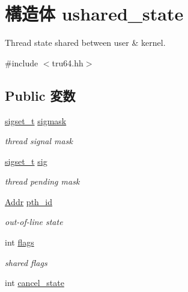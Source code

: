 \hypertarget{structTru64_1_1ushared__state}{
\section{構造体 ushared\_\-state}
\label{structTru64_1_1ushared__state}
}


Thread state shared between user \& kernel.  


{\ttfamily \#include $<$tru64.hh$>$}\subsection*{Public 変数}
\begin{DoxyCompactItemize}
\item 
\hyperlink{classTru64_ae770e87ab143e8ad7feaf75b78a89718}{sigset\_\-t} \hyperlink{structTru64_1_1ushared__state_a84a273d642c19957017a87b1f54031e6}{sigmask}
\begin{DoxyCompactList}\small\item\em thread signal mask \item\end{DoxyCompactList}\item 
\hyperlink{classTru64_ae770e87ab143e8ad7feaf75b78a89718}{sigset\_\-t} \hyperlink{structTru64_1_1ushared__state_a9c53d1e3c0bc3d8be6911f0f232a7079}{sig}
\begin{DoxyCompactList}\small\item\em thread pending mask \item\end{DoxyCompactList}\item 
\hyperlink{base_2types_8hh_af1bb03d6a4ee096394a6749f0a169232}{Addr} \hyperlink{structTru64_1_1ushared__state_a7e2b56424c95350d108ff8d0fab23b48}{pth\_\-id}
\begin{DoxyCompactList}\small\item\em out-\/of-\/line state \item\end{DoxyCompactList}\item 
int \hyperlink{structTru64_1_1ushared__state_ac8bf36fe0577cba66bccda3a6f7e80a4}{flags}
\begin{DoxyCompactList}\small\item\em shared flags \item\end{DoxyCompactList}\item 
int \hyperlink{structTru64_1_1ushared__state_aabbd9f971cb4aa1bd714e3f22cd35654}{cancel\_\-state}

\end{DoxyCompactItemize}
